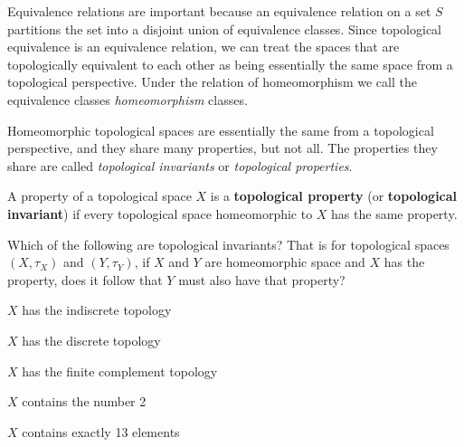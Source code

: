 Equivalence relations are important because an equivalence relation on a set $S$ partitions the set into a disjoint union of equivalence classes. Since topological equivalence is an equivalence relation, we can treat the spaces that are topologically equivalent to each other as being essentially the same space from a topological perspective. Under the relation of homeomorphism we call the equivalence classes \emph{homeomorphism} classes. 


Homeomorphic topological spaces are essentially the same from a topological perspective, and they share many properties, but not all. The properties they share are called \textit{topological invariants} or \emph{topological properties}.

\begin{definition} A property of a topological space $X$ is a \textbf{topological property} (or \textbf{topological invariant}) if every topological space homeomorphic to $X$ has the same property. 
\end{definition}

\begin{activity} Which of the following are topological invariants? That is for topological spaces $(X, \tau_X)$ and $(Y, \tau_Y)$, if $X$ and $Y$ are homeomorphic space and $X$ has the property, does it follow that $Y$ must also have that property?
\ba
\item $X$ has the indiscrete topology
\item $X$ has the discrete topology
\item $X$ has the finite complement topology
\item $X$ contains the number 2
\item $X$ contains exactly 13 elements
\ea
\end{activity}


